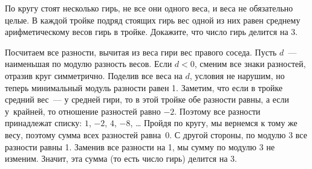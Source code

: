\problem
По кругу стоят несколько гирь, не все они одного веса, и веса не обязательно
целые.
В каждой тройке подряд стоящих гирь вес одной из них равен среднему
арифметическому весов гирь в тройке.
Докажите, что число гирь делится на 3.

\solution
Посчитаем все разности, вычитая из веса гири вес правого соседа.
Пусть $d$~--- наименьшая по модулю разность весов.
Если $d < 0$, сменим все знаки разностей, отразив круг симметрично.
Поделив все веса на $d$, условия не нарушим, но теперь минимальный модуль
разности равен 1.
Заметим, что если в тройке средний вес~--- у средней гири, то в этой тройке обе
разности равны, а если у~крайней, то отношение разностей равно $-2$.
Поэтому все разности принадлежат списку: $1$, $-2$, $4$, $-8$, \ldots
Пройдя по кругу, мы вернемся к тому же весу, поэтому сумма всех разностей
равна~0.
С другой стороны, по модулю 3 все разности равны 1.
Заменив все разности на 1, мы сумму по модулю 3 не изменим.
Значит, эта сумма (то есть число гирь) делится на 3.
\endproblem
